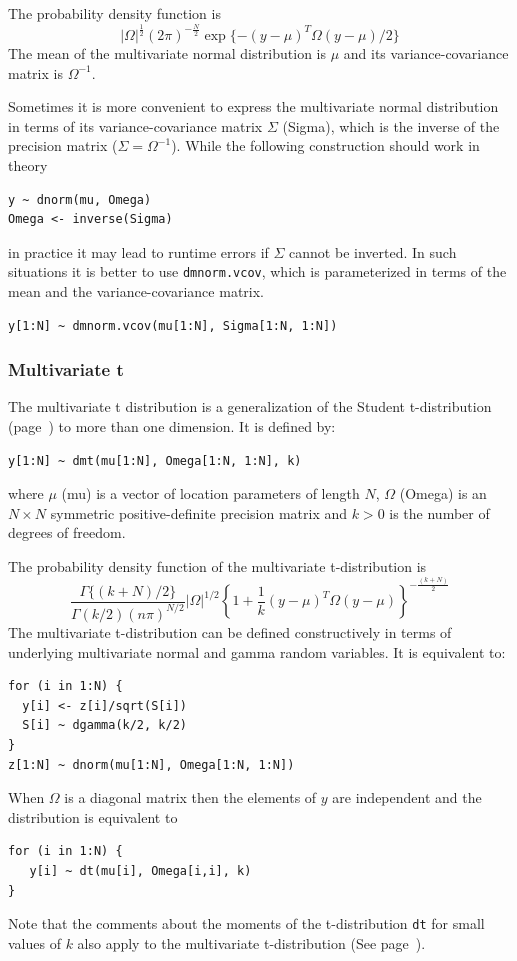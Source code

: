 \documentclass[11pt, a4paper, titlepage]{report}
\begin{document}
{The probability density function is
\[
|\Omega|^{\frac{1}{2}} \left(2\pi\right)^{-\frac{N}{2}}
\exp\{-(y-\mu)^T \Omega (y-\mu) / 2\}
\]
The mean of the multivariate normal distribution is $\mu$ and its
variance-covariance matrix is $\Omega^{-1}$.

Sometimes it is more convenient to express the multivariate normal
distribution in terms of its variance-covariance matrix $\Sigma$ (Sigma),
which is the inverse of the precision matrix ($\Sigma = \Omega^{-1}$).
While the following construction should work in theory
\begin{verbatim}
y ~ dnorm(mu, Omega)
Omega <- inverse(Sigma)
\end{verbatim}
in practice it may lead to runtime errors if $\Sigma$ cannot be inverted.
In such situations it is better to use \texttt{dmnorm.vcov}, which
is parameterized in terms of the mean and the variance-covariance matrix.
\begin{verbatim}
y[1:N] ~ dmnorm.vcov(mu[1:N], Sigma[1:N, 1:N])
\end{verbatim}


\subsubsection{Multivariate t}

The multivariate t distribution is a generalization of the Student
t-distribution (page~\pageref{bugs:dt}) to more than one dimension. It
is defined by:
\begin{verbatim}
y[1:N] ~ dmt(mu[1:N], Omega[1:N, 1:N], k)
\end{verbatim}
where $\mu$ (mu) is a vector of location parameters of length $N$,
$\Omega$ (Omega) is an $N \times N$ symmetric positive-definite
precision matrix and $k > 0$ is the number of degrees of freedom.

The probability density function of the multivariate t-distribution is
\[
\frac{\textstyle \Gamma \{(k+N)/2\}}{\textstyle \Gamma(k/2) (n\pi)^{N/2}}
|\Omega|^{1/2}
\left\{1 + \frac{1}{k} (y - \mu)^T \Omega (y - \mu) \right\}^{-\frac{(k+N)}{2}}
\]
The multivariate t-distribution can be defined constructively in terms
of underlying multivariate normal and gamma random variables. It is
equivalent to:
\begin{verbatim}
for (i in 1:N) {
  y[i] <- z[i]/sqrt(S[i])
  S[i] ~ dgamma(k/2, k/2)
}
z[1:N] ~ dnorm(mu[1:N], Omega[1:N, 1:N])
\end{verbatim}

When $\Omega$ is a diagonal matrix then the elements of $y$ are independent
and the distribution is equivalent to 
\begin{verbatim}
for (i in 1:N) {
   y[i] ~ dt(mu[i], Omega[i,i], k)
}
\end{verbatim}
Note that the comments about the moments of the t-distribution \texttt{dt} for
small values of $k$ also apply to the multivariate t-distribution (See
page~\pageref{bugs:dt}).

}
\end{document}
